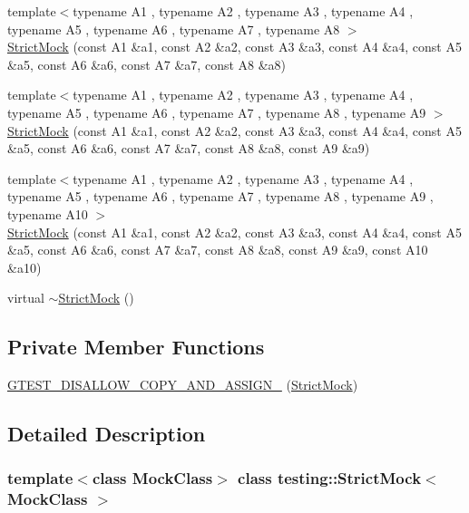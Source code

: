 \begin{DoxyCompactItemize}
\item 
{\footnotesize template$<$typename A1 , typename A2 , typename A3 , typename A4 , typename A5 , typename A6 , typename A7 , typename A8 $>$ }\\\hyperlink{classtesting_1_1StrictMock_aac6eaaad3e94491ada7bb43ee6149775}{Strict\+Mock} (const A1 \&a1, const A2 \&a2, const A3 \&a3, const A4 \&a4, const A5 \&a5, const A6 \&a6, const A7 \&a7, const A8 \&a8)
\item 
{\footnotesize template$<$typename A1 , typename A2 , typename A3 , typename A4 , typename A5 , typename A6 , typename A7 , typename A8 , typename A9 $>$ }\\\hyperlink{classtesting_1_1StrictMock_a4129f247ae087d586fdb04f450422d3e}{Strict\+Mock} (const A1 \&a1, const A2 \&a2, const A3 \&a3, const A4 \&a4, const A5 \&a5, const A6 \&a6, const A7 \&a7, const A8 \&a8, const A9 \&a9)
\item 
{\footnotesize template$<$typename A1 , typename A2 , typename A3 , typename A4 , typename A5 , typename A6 , typename A7 , typename A8 , typename A9 , typename A10 $>$ }\\\hyperlink{classtesting_1_1StrictMock_a4936b0a5622b39e974deae12ecb1430b}{Strict\+Mock} (const A1 \&a1, const A2 \&a2, const A3 \&a3, const A4 \&a4, const A5 \&a5, const A6 \&a6, const A7 \&a7, const A8 \&a8, const A9 \&a9, const A10 \&a10)
\item 
virtual \hyperlink{classtesting_1_1StrictMock_ae22ba62955775b26c88937ee225db528}{$\sim$\+Strict\+Mock} ()
\end{DoxyCompactItemize}
\subsection*{Private Member Functions}
\begin{DoxyCompactItemize}
\item 
\hyperlink{classtesting_1_1StrictMock_af8425a436acea9e665a223971bac8a71}{G\+T\+E\+S\+T\+\_\+\+D\+I\+S\+A\+L\+L\+O\+W\+\_\+\+C\+O\+P\+Y\+\_\+\+A\+N\+D\+\_\+\+A\+S\+S\+I\+G\+N\+\_\+} (\hyperlink{classtesting_1_1StrictMock}{Strict\+Mock})
\end{DoxyCompactItemize}


\subsection{Detailed Description}
\subsubsection*{template$<$class Mock\+Class$>$\newline
class testing\+::\+Strict\+Mock$<$ Mock\+Class $>$}



